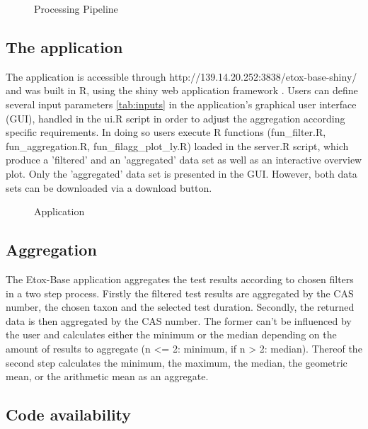 \documentclass[english]{article}
\newcommand{\etoxbase}{Etox-Base}
\newcommand{\app}{http://139.14.20.252:3838/etox-base-shiny/}
\begin{document}
\begin{figure}
    
    \caption{Processing Pipeline}
    \label{fig:pipeline}
\end{figure}


\subsection*{The application}
The application is accessible through \app{} and was built in R, using the shiny web application framework \citep{chang_shiny_2018}. Users can define several input parameters \ref{tab:inputs} in the application's graphical user interface (GUI), handled in the ui.R script in order to adjust the aggregation according specific requirements. In doing so users execute R functions (fun\_filter.R, fun\_aggregation.R, fun\_filagg\_plot\_ly.R) loaded in the server.R script, which produce a 'filtered' and an 'aggregated' data set as well as an interactive overview plot. Only the 'aggregated' data set is presented in the GUI. However, both data sets can be downloaded via a download button.

\begin{figure}
    
    \caption{Application}
    \label{fig:app}
\end{figure}

\subsection*{Aggregation}
The \etoxbase{} application aggregates the test results according to chosen filters in a two step process. Firstly the filtered test results are aggregated by the CAS number, the chosen taxon and the selected test duration. Secondly, the returned data is then aggregated by the CAS number. The former can't be influenced by the user and calculates either the minimum or the median depending on the amount of results to aggregate (n <= 2: minimum, if n > 2: median). Thereof the second step calculates the minimum, the maximum, the median, the geometric mean, or the arithmetic mean as an aggregate. 







\subsection*{Code availability}
\end{document}

